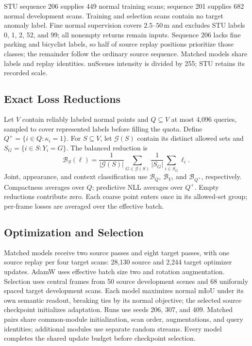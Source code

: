 \documentclass{article}
\begin{document}
STU sequence 206 supplies 449 normal training scans; sequence 201 supplies 682 normal development scans. Training and selection scans contain no target anomaly label. Fine normal supervision covers $2.5$--$50$\,m and excludes STU labels 0, 1, 2, 52, and 99; all nonempty returns remain inputs. Sequence 206 lacks fine parking and bicyclist labels, so half of source replay positions prioritize those classes; the remainder follow the ordinary source sequence. Matched models share labels and replay identities. nuScenes intensity is divided by 255; STU retains its recorded scale.

\subsection{Exact Loss Reductions}
Let $V$ contain reliably labeled normal points and $Q\subseteq V$ at most 4,096 queries, sampled to cover represented labels before filling the quota. Define $Q^+=\{i\in Q:\kappa_i=1\}$. For $S\subseteq V$, let $\mathcal G(S)$ contain its distinct allowed sets and $S_G=\{i\in S:Y_i=G\}$. The balanced reduction is
\begin{equation}
 \mathcal B_S(\ell)=\frac1{|\mathcal G(S)|}\sum_{G\in\mathcal G(S)}\frac1{|S_G|}\sum_{i\in S_G}\ell_i.
\end{equation}
Joint, appearance, and context classification use $\mathcal B_Q$, $\mathcal B_V$, and $\mathcal B_{Q^+}$, respectively. Compactness averages over $Q$; predictive NLL averages over $Q^+$. Empty reductions contribute zero. Each coarse point enters once in its allowed-set group; per-frame losses are averaged over the effective batch.

\subsection{Optimization and Selection}
Matched models receive two source passes and eight target passes, with one source replay per four target scans: 28,130 source and 2,244 target optimizer updates. AdamW uses effective batch size two and rotation augmentation. Selection uses central frames from 50 source development scenes and 68 uniformly spaced target development scans. Each model maximizes normal mIoU under its own semantic readout, breaking ties by its normal objective; the selected source checkpoint initializes adaptation. Runs use seeds 206, 307, and 409. Matched pairs share common-module initialization, scan order, augmentations, and query identities; additional modules use separate random streams. Every model completes the shared update budget before checkpoint selection.
\end{document}
